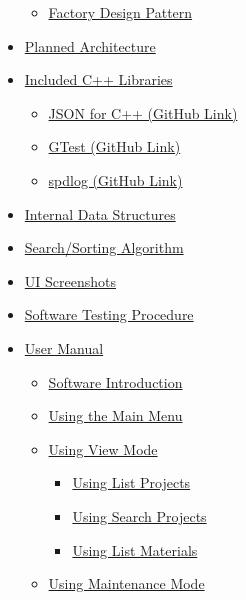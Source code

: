 \documentclass[
  english,
  a4paper,
,tablecaptionabove
]{scrartcl}
\providecommand{\tightlist}{%
  \setlength{\itemsep}{0pt}\setlength{\parskip}{0pt}}
\begin{document}
\begin{itemize}
  \begin{itemize}
  \tightlist
  \item
    \protect\hyperlink{factory-design-pattern}{Factory Design Pattern}
  \end{itemize}
\item
  \protect\hyperlink{planned-architecture}{Planned Architecture}
\item
  \protect\hyperlink{included-c-libraries}{Included C++ Libraries}

  \begin{itemize}
  \tightlist
  \item
    \protect\hyperlink{json-for-c-github-link}{JSON for C++ (GitHub
    Link)}
  \item
    \protect\hyperlink{gtest-github-link}{GTest (GitHub Link)}
  \item
    \protect\hyperlink{spdlog-github-link}{spdlog (GitHub Link)}
  \end{itemize}
\item
  \protect\hyperlink{internal-data-structures}{Internal Data Structures}
\item
  \protect\hyperlink{searchsorting-algorithm}{Search/Sorting Algorithm}
\item
  \protect\hyperlink{ui-screenshots}{UI Screenshots}
\item
  \protect\hyperlink{software-testing-procedure}{Software Testing
  Procedure}
\item
  \protect\hyperlink{user-manual}{User Manual}

  \begin{itemize}
  \tightlist
  \item
    \protect\hyperlink{software-introduction}{Software Introduction}
  \item
    \protect\hyperlink{using-the-main-menu}{Using the Main Menu}
  \item
    \protect\hyperlink{using-view-mode}{Using View Mode}

    \begin{itemize}
    \tightlist
    \item
      \protect\hyperlink{using-list-projects}{Using List Projects}
    \item
      \protect\hyperlink{using-search-projects}{Using Search Projects}
    \item
      \protect\hyperlink{using-list-materials}{Using List Materials}
    \end{itemize}
  \item
    \protect\hyperlink{using-maintenance-mode}{Using Maintenance Mode}


\end{itemize}
\end{itemize}
\end{document}
